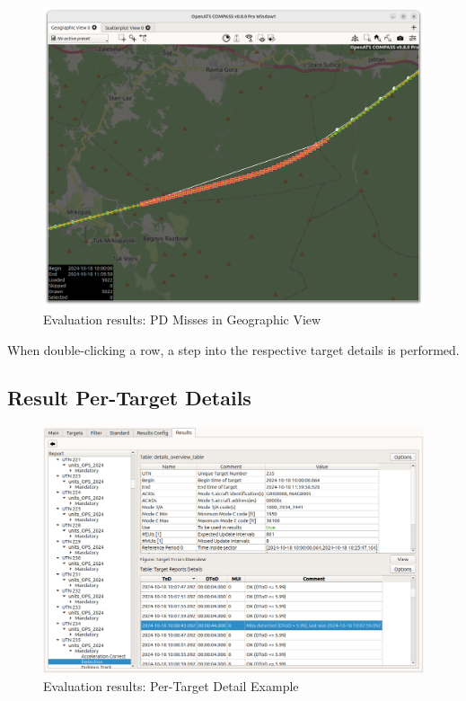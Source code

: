 \begin{figure}[H]
  \hspace*{-2.5cm}
    \includegraphics[width=19cm]{figures/eval_results_single_geoview.png}
  \caption{Evaluation results: PD Misses in Geographic View}
\end{figure}

When double-clicking a row, a step into the respective target details is performed.

\subsection{Result Per-Target Details}

\begin{figure}[H]
  \hspace*{-2cm}
    \includegraphics[width=18cm,frame]{figures/eval_results_target_example.png}
  \caption{Evaluation results: Per-Target Detail Example}
\end{figure}

